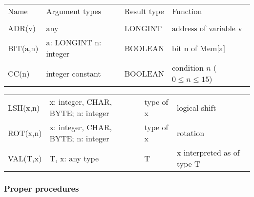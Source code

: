 \begin{flushleft}
\ifcompact \small \fi
\settowidth{\FuncName}{ROT(w,w)}
\settowidth{\FuncRes}{BOOLEAN}
\ifcompact
        \FuncArg=2.5cm
        \FuncFun=3.5cm
\else
        \FuncArg=2.8cm
        \FuncFun=4.4cm
\fi
\begin{tabular}{p{\FuncName}p{\FuncArg}p{\FuncRes}p{\FuncFun}}
Name     & Argument types   & Result type & Function \\
         & \\
ADR(v)   & any              & LONGINT     & address of variable v \\
BIT(a,n) & a: LONGINT
          n: integer        & BOOLEAN     & bit n of Mem[a] \\
CC(n)    & integer constant & BOOLEAN     & condition $n$ ($0\leq n\leq 15$) \\
\end{tabular}
\begin{tabular}{p{\FuncName}p{\FuncArg}p{\FuncRes}p{\FuncFun}}
LSH(x,n) & x: integer,
          CHAR, BYTE;
          n: integer         & type of x  &  logical shift \\
ROT(x,n) & x: integer,
          CHAR, BYTE;
          n: integer         & type of x  &  rotation \\
VAL(T,x) & T, x: any type    & T          & x interpreted as of type T \\
\end{tabular}
\end{flushleft}

\subsubsection{Proper procedures}

